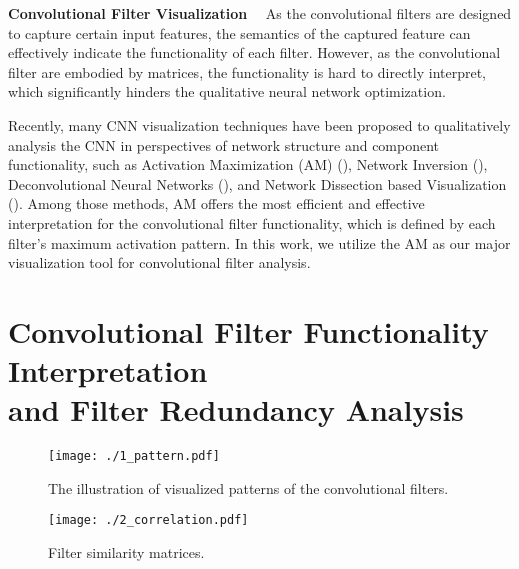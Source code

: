 \documentclass{article} %
\begin{document}
\textbf{Convolutional Filter Visualization}
~~As the convolutional filters are designed to capture certain input features, the semantics of the captured feature can effectively indicate the functionality of each filter.
	However, as the convolutional filter are embodied by matrices, the  functionality is hard to directly interpret, which significantly hinders the qualitative neural network optimization.

Recently, many CNN visualization techniques have been proposed to qualitatively analysis the CNN in perspectives of network structure and component functionality,
	such as Activation Maximization (AM) (\cite{Yosinski:2015:ICML:AM}), Network Inversion (\cite{mahendran2015:Network-Inversion}), Deconvolutional Neural Networks (\cite{Zeiler:2014:ECCV:DeconvolNet}), and Network Dissection based Visualization (\cite{Zhou:2016:CVPR:Network-Dissection}).
	Among those methods, AM offers the most efficient and effective interpretation for the convolutional filter functionality, which is defined by each filter's maximum activation pattern.
In this work, we utilize the AM as our major visualization tool for convolutional filter analysis.

\section{Convolutional Filter Functionality Interpretation \\ \hspace{5.5mm} and Filter Redundancy Analysis}\label{sec:visual}\begin{figure}
	\begin{minipage}[c]{0.5\linewidth}
		\texttt{[image: ./1\_pattern.pdf]}
		\caption{The illustration of visualized patterns of the convolutional filters.}
		\label{fig:vis}
	\end{minipage}
	\hfill
	\begin{minipage}[c]{0.5\linewidth}
	\vspace{-2mm}
		\texttt{[image: ./2\_correlation.pdf]}
		\vspace{1mm}
		\caption{Filter similarity matrices.}
		\label{fig:sim}
	\end{minipage}
\end{figure}
\end{document}
